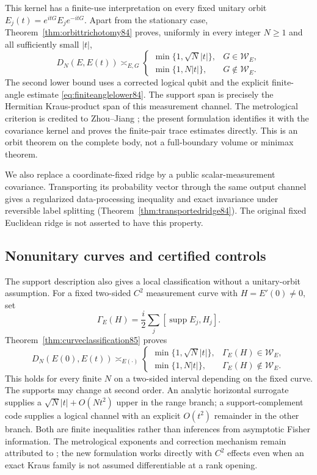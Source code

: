 This kernel has a finite-use interpretation on every fixed unitary
orbit $E_j(t)=e^{itG}E_je^{-itG}$.  Apart from the stationary case,
Theorem~\ref{thm:orbittrichotomy84} proves, uniformly in every integer
$N\ge1$ and all sufficiently small $|t|$,
\begin{equation}\label{eq:frontorbit84}
 D_N(E,E(t))\asymp_{E,G}
 \begin{cases}
 \min\{1,\sqrt N|t|\},&G\in\mathcal W_E,\\
 \min\{1,N|t|\},&G\notin\mathcal W_E.
 \end{cases}
\end{equation}
The second lower bound uses a corrected logical qubit and the explicit
finite-angle estimate \eqref{eq:finiteanglelower84}.
The support span is precisely the Hermitian Kraus-product span of
this measurement channel.  The metrological criterion is credited
to Zhou--Jiang \cite{ZJ84}; the present formulation identifies it
with the covariance kernel and proves the finite-pair trace estimates
directly.  This is an orbit theorem on the complete body, not a
full-boundary volume or minimax theorem.

We also replace a coordinate-fixed ridge by a public scalar-measurement
covariance.  Transporting its probability vector through the same
output channel gives a regularized data-processing inequality and
exact invariance under reversible label splitting
(Theorem~\ref{thm:transportedridge84}).  The original fixed Euclidean
ridge is not asserted to have this property.

\subsection{Nonunitary curves and certified controls}
The support description also gives a local classification without a
unitary-orbit assumption.  For a fixed two-sided $C^2$ measurement curve
with $H=E'(0)\ne0$, set
\[
 \Gamma_E(H)=\frac i2\sum_j[\operatorname{supp}E_j,H_j].
\]
Theorem~\ref{thm:curveclassification85} proves
\[
 D_N(E(0),E(t))\asymp_{E(\cdot)}
 \begin{cases}
 \min\{1,\sqrt N|t|\},&\Gamma_E(H)\in\mathcal W_E,\\
 \min\{1,N|t|\},&\Gamma_E(H)\notin\mathcal W_E.
 \end{cases}
\]
This holds for every finite $N$ on a two-sided interval depending on
the fixed curve.  The supports may change at second order.  An analytic
horizontal surrogate supplies a $\sqrt N|t|+O(Nt^2)$ upper in the
range branch; a support-complement code supplies a logical channel
with an explicit $O(t^2)$ remainder in the other branch.  Both are
finite inequalities rather than inferences from asymptotic Fisher
information.  The metrological exponents and correction mechanism
remain attributed to \cite{ZJ84,KL84}; the new formulation works
directly with $C^2$ effects even when an exact Kraus family is not
assumed differentiable at a rank opening.

